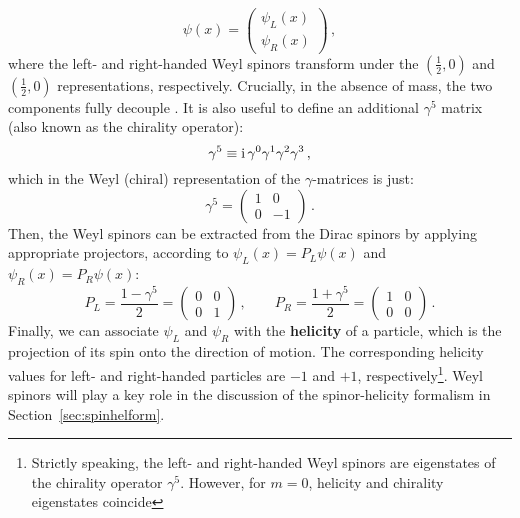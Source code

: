 \documentclass[main.tex]{subfiles}
\begin{document}
\begin{equation}
    \psi(x) = 
    \begin{pmatrix}
        \psi_L(x) \\
        \psi_R(x)
    \end{pmatrix}\,,
\end{equation}
where the left- and right-handed Weyl spinors transform under the $\left(\frac{1}{2}, 0 \right)$ and $\left(\frac{1}{2}, 0 \right)$ representations, respectively. Crucially, in the absence of mass, the two components fully decouple . It is also useful to define an additional $\gamma^5$ matrix (also known as the chirality operator): 
\begin{equation}
    \gamma^5 \equiv \mathrm{i}\, \gamma^0 \gamma^1 \gamma^2 \gamma^3\,,
\end{equation}
which in the Weyl (chiral) representation of the $\gamma$-matrices is just:
\begin{equation}
    \gamma^5 = 
    \begin{pmatrix}
        1 & 0 \\
        0 & -1
    \end{pmatrix}\,.
\end{equation}
Then, the Weyl spinors can be extracted from the Dirac spinors by applying appropriate projectors, according to $\psi_L(x) = P_L\psi(x)$ and $\psi_R(x) = P_R\psi(x)$:
\begin{equation}
    P_L = \frac{1-\gamma^5}{2} = 
    \begin{pmatrix}
        0 & 0 \\
        0 & 1
    \end{pmatrix}\,,
    \qquad
    P_R = \frac{1+\gamma^5}{2} = 
    \begin{pmatrix}
        1 & 0 \\
        0 & 0
    \end{pmatrix}\,.
\end{equation}
Finally, we can associate $\psi_L$ and $\psi_R$ with the \textbf{helicity} of a particle, which is the projection of its spin onto the direction of motion. The corresponding helicity values for left- and right-handed particles are $-1$ and $+1$, respectively\footnote{Strictly speaking, the left- and right-handed Weyl spinors are eigenstates of the chirality operator $\gamma^5$. However, for $m=0$, helicity and chirality eigenstates coincide}.
Weyl spinors will play a key role in the discussion of the spinor-helicity formalism in Section~\ref{sec:spinhelform}.
\end{document}
